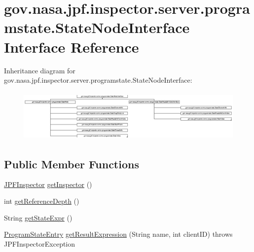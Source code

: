 \hypertarget{interfacegov_1_1nasa_1_1jpf_1_1inspector_1_1server_1_1programstate_1_1_state_node_interface}{}\section{gov.\+nasa.\+jpf.\+inspector.\+server.\+programstate.\+State\+Node\+Interface Interface Reference}
\label{interfacegov_1_1nasa_1_1jpf_1_1inspector_1_1server_1_1programstate_1_1_state_node_interface}
Inheritance diagram for gov.\+nasa.\+jpf.\+inspector.\+server.\+programstate.\+State\+Node\+Interface\+:\begin{figure}[H]
\begin{center}
\leavevmode
\includegraphics[height=2.592592cm]{interfacegov_1_1nasa_1_1jpf_1_1inspector_1_1server_1_1programstate_1_1_state_node_interface}
\end{center}
\end{figure}
\subsection*{Public Member Functions}
\begin{DoxyCompactItemize}
\item 
\hyperlink{classgov_1_1nasa_1_1jpf_1_1inspector_1_1server_1_1jpf_1_1_j_p_f_inspector}{J\+P\+F\+Inspector} \hyperlink{interfacegov_1_1nasa_1_1jpf_1_1inspector_1_1server_1_1programstate_1_1_state_node_interface_af5208348883828a3aac1a37b7a94495f}{get\+Inspector} ()
\item 
int \hyperlink{interfacegov_1_1nasa_1_1jpf_1_1inspector_1_1server_1_1programstate_1_1_state_node_interface_a43421bffd69d07e4dc11d71504524287}{get\+Reference\+Depth} ()
\item 
String \hyperlink{interfacegov_1_1nasa_1_1jpf_1_1inspector_1_1server_1_1programstate_1_1_state_node_interface_ad6918e06b7d8b9a83b0b0e26540d94c8}{get\+State\+Expr} ()
\item 
\hyperlink{classgov_1_1nasa_1_1jpf_1_1inspector_1_1common_1_1pse_1_1_program_state_entry}{Program\+State\+Entry} \hyperlink{interfacegov_1_1nasa_1_1jpf_1_1inspector_1_1server_1_1programstate_1_1_state_node_interface_a6072d5b251380a0697a0e57e5a2e4e03}{get\+Result\+Expression} (String name, int client\+ID)  throws J\+P\+F\+Inspector\+Exception
\end{DoxyCompactItemize}


